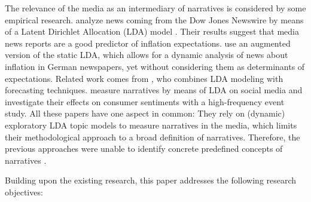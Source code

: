 The relevance of the media as an intermediary of narratives \citep{Ellen.2022} is considered by some empirical research. \cite{Larsen.2021} analyze news coming from the Dow Jones Newswire by means of a Latent Dirichlet Allocation (LDA) model \citep{blei.2003}.  Their results suggest that media news reports are a good predictor of inflation expectations. \cite{Mueller.2022} use an augmented version of the static LDA, which allows for a dynamic analysis of news about inflation in German newspapers, yet without considering them as determinants of expectations. Related work comes from \cite{Hong.2022}, who combines LDA modeling with forecasting techniques. \cite{Macaulay.2022} measure narratives by means of LDA on social media and investigate their effects on consumer sentiments with a high-frequency event study. All these papers have one aspect in common: They rely on (dynamic) exploratory LDA topic models to measure narratives in the media, which limits their methodological approach to a broad definition of narratives. Therefore, the previous approaches were unable to identify concrete predefined concepts of narratives \citep{reccius.2024}. 

Building upon the existing research, this paper addresses the following research objectives:

